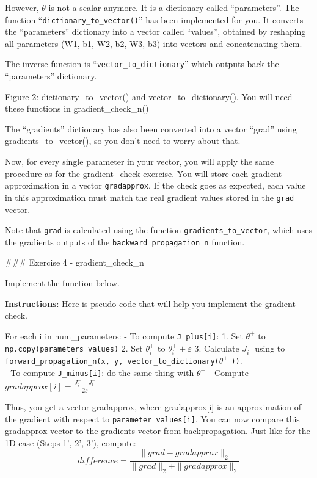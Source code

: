 \documentclass[11pt]{article}
\begin{document}
However, \(\theta\) is not a scalar anymore. It is a dictionary called
``parameters''. The function ``\texttt{dictionary\_to\_vector()}'' has
been implemented for you. It converts the ``parameters'' dictionary into
a vector called ``values'', obtained by reshaping all parameters (W1,
b1, W2, b2, W3, b3) into vectors and concatenating them.

The inverse function is ``\texttt{vector\_to\_dictionary}'' which
outputs back the ``parameters'' dictionary.

Figure 2: dictionary\_to\_vector() and vector\_to\_dictionary(). You
will need these functions in gradient\_check\_n()

The ``gradients'' dictionary has also been converted into a vector
``grad'' using gradients\_to\_vector(), so you don't need to worry about
that.

Now, for every single parameter in your vector, you will apply the same
procedure as for the gradient\_check exercise. You will store each
gradient approximation in a vector \texttt{gradapprox}. If the check
goes as expected, each value in this approximation must match the real
gradient values stored in the \texttt{grad} vector.

Note that \texttt{grad} is calculated using the function
\texttt{gradients\_to\_vector}, which uses the gradients outputs of the
\texttt{backward\_propagation\_n} function.

\#\#\# Exercise 4 - gradient\_check\_n

Implement the function below.

\textbf{Instructions}: Here is pseudo-code that will help you implement
the gradient check.

For each i in num\_parameters: - To compute \texttt{J\_plus{[}i{]}}: 1.
Set \(\theta^{+}\) to \texttt{np.copy(parameters\_values)} 2. Set
\(\theta^{+}_i\) to \(\theta^{+}_i + \varepsilon\) 3. Calculate
\(J^{+}_i\) using to
\texttt{forward\_propagation\_n(x,\ y,\ vector\_to\_dictionary(}\(\theta^{+}\)
\texttt{))}.\\
- To compute \texttt{J\_minus{[}i{]}}: do the same thing with
\(\theta^{-}\) - Compute
\(gradapprox[i] = \frac{J^{+}_i - J^{-}_i}{2 \varepsilon}\)

Thus, you get a vector gradapprox, where gradapprox{[}i{]} is an
approximation of the gradient with respect to
\texttt{parameter\_values{[}i{]}}. You can now compare this gradapprox
vector to the gradients vector from backpropagation. Just like for the
1D case (Steps 1', 2', 3'), compute:
\[ difference = \frac {\| grad - gradapprox \|_2}{\| grad \|_2 + \| gradapprox \|_2 } \tag{3}\]
\end{document}
